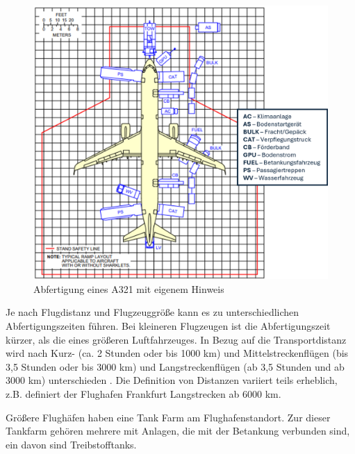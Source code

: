 \begin{figure}[h]
	\centering
	\includegraphics[width=0.8\linewidth]{Bilder/A321_Abfertigung.png}
	\caption[Abfertigung eines Flugzeugs am Parkposition]{Abfertigung eines A321 \cite{airbus2022a321} mit eigenem Hinweis}
	\label{abfertigung}
\end{figure}

Je nach Flugdistanz und Flugzeuggröße kann es zu unterschiedlichen Abfertigungszeiten führen. 
Bei kleineren Flugzeugen ist die Abfertigungszeit kürzer, als die eines größeren Luftfahrzeuges. 
In Bezug auf die Transportdistanz wird nach Kurz- (ca. 2 Stunden oder bis 1000 km) 
und Mittelstreckenflügen (bis 3,5 Stunden oder bis 3000 km) und 
Langstreckenflügen (ab 3,5 Stunden und ab 3000 km) unterschieden \cite{mensen2013handbuch}.
Die Definition von Distanzen variiert teils erheblich, 
z.B. definiert der Flughafen Frankfurt Langstrecken ab 6000 km.%


Größere Flughäfen haben eine Tank Farm am Flughafenstandort. Zur dieser Tankfarm gehören mehrere mit Anlagen, die mit
der Betankung verbunden sind, ein davon sind Treibstofftanks.
